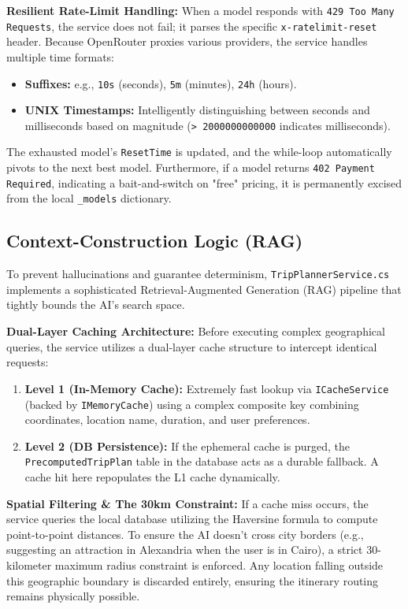 \textbf{Resilient Rate-Limit Handling:}
When a model responds with \texttt{429 Too Many Requests}, the service does not fail; it parses the specific \texttt{x-ratelimit-reset} header. Because OpenRouter proxies various providers, the service handles multiple time formats:
\begin{itemize}
    \item \textbf{Suffixes:} e.g., \texttt{10s} (seconds), \texttt{5m} (minutes), \texttt{24h} (hours).
    \item \textbf{UNIX Timestamps:} Intelligently distinguishing between seconds and milliseconds based on magnitude (\texttt{> 2000000000000} indicates milliseconds).
\end{itemize}
The exhausted model's \texttt{ResetTime} is updated, and the while-loop automatically pivots to the next best model. Furthermore, if a model returns \texttt{402 Payment Required}, indicating a bait-and-switch on "free" pricing, it is permanently excised from the local \texttt{\_models} dictionary.

\subsection{Context-Construction Logic (RAG)}
To prevent hallucinations and guarantee determinism, \texttt{TripPlannerService.cs} implements a sophisticated Retrieval-Augmented Generation (RAG) pipeline that tightly bounds the AI's search space.

\textbf{Dual-Layer Caching Architecture:}
Before executing complex geographical queries, the service utilizes a dual-layer cache structure to intercept identical requests:
\begin{enumerate}
    \item \textbf{Level 1 (In-Memory Cache):} Extremely fast lookup via \texttt{ICacheService} (backed by \texttt{IMemoryCache}) using a complex composite key combining coordinates, location name, duration, and user preferences.
    \item \textbf{Level 2 (DB Persistence):} If the ephemeral cache is purged, the \texttt{PrecomputedTripPlan} table in the database acts as a durable fallback. A cache hit here repopulates the L1 cache dynamically.
\end{enumerate}

\textbf{Spatial Filtering \& The 30km Constraint:}
If a cache miss occurs, the service queries the local database utilizing the Haversine formula to compute point-to-point distances. To ensure the AI doesn't cross city borders (e.g., suggesting an attraction in Alexandria when the user is in Cairo), a strict 30-kilometer maximum radius constraint is enforced. Any location falling outside this geographic boundary is discarded entirely, ensuring the itinerary routing remains physically possible.


